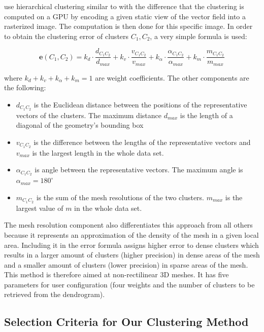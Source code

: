 \citet{Peng12} use hierarchical clustering similar to \citet{Telea99} with the difference that the clustering is computed on a GPU by encoding a given static view of the vector field into a rasterized image. The computation is then done for this specific image. In order to obtain the clustering error of clusters \(C_1, C_2\), a very simple formula is used:

\begin{equation} \label{eq:clustering_error}
\bm{e}(C_1,C_2) = k_d \cdot \frac{d_{C_1C_2}}{d_{max}} + k_v \cdot \frac{v_{C_1C_2}}{v_{max}} + k_\alpha \cdot \frac{\alpha_{C_1C_2}}{\alpha_{max}} + k_m \cdot \frac{m_{C_1C_2}}{m_{max}}
\end{equation}

where \(k_d + k_v + k_\alpha + k_m = 1\) are weight coefficients. The other components are the following:

\begin{itemize}
\item \(d_{C_1C_2}\) is the Euclidean distance between the positions of the representative vectors of the clusters. The maximum distance \(d_{max}\) is the length of a diagonal of the geometry's bounding box
\item \(v_{C_1C_2}\) is the difference between the lengths of the representative vectors and \(v_{max}\) is the largest length in the whole data set.
\item \(\alpha_{C_1C_2}\) is angle between the representative vectors. The maximum angle is \(\alpha_{max} = 180^\circ\)
\item \(m_{C_1C_2}\) is the sum of the mesh resolutions of the two clusters. \(m_{max}\) is the largest value of \(m\) in the whole data set.
\end{itemize}

The mesh resolution component also differentiates this approach from all others because it represents an approximation of the density of the mesh in a given local area. Including it in the error formula assigns higher error to dense clusters which results in a larger amount of clusters (higher precision) in dense areas of the mesh and a smaller amount of clusters (lower precision) in sparse areas of the mesh. This method is therefore aimed at non-rectilinear 3D meshes. It has five parameters for user configuration (four weights and the number of clusters to be retrieved from the dendrogram).
\subsection{Selection Criteria for Our Clustering Method}

